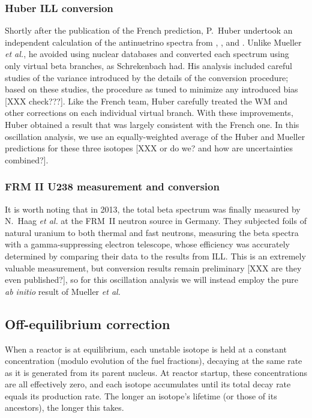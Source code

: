 \documentclass[../thesis.tex]{subfiles}
\begin{document}
\subsubsection{Huber ILL conversion}
\label{sec:huberconv}

Shortly after the publication of the French prediction, P.~Huber undertook an independent calculation of the antinuetrino spectra from \urfive, \punine, and \puone. Unlike Mueller \emph{et al.}, he avoided using nuclear databases and converted each spectrum using only virtual beta branches, as Schrekenbach had. His analysis included careful studies of the variance introduced by the details of the conversion procedure; based on these studies, the procedure as tuned to minimize any introduced bias [XXX check???]. Like the French team, Huber carefully treated the WM and other corrections on each individual virtual branch. With these improvements, Huber obtained a result that was largely consistent with the French one. In this oscillation analysis, we use an equally-weighted average of the Huber and Mueller predictions for these three isotopes [XXX or do we? and how are uncertainties combined?].

\subsubsection{FRM II U238 measurement and conversion}
\label{sec:u238conv}

It is worth noting that in 2013, the \ureight total beta spectrum was finally measured by N.~Haag \emph{et al.} at the FRM~II neutron source in Germany. They subjected foils of natural uranium to both thermal and fast neutrons, measuring the beta spectra with a gamma-suppressing electron telescope, whose efficiency was accurately determined by comparing their \urfive data to the results from ILL. This is an extremely valuable measurement, but conversion results remain preliminary [XXX are they even published?], so for this oscillation analysis we will instead employ the pure \emph{ab initio} result of Mueller \emph{et al.}

\subsection{Off-equilibrium correction}
\label{sec:offeqcorr}

When a reactor is at equilibrium, each unstable isotope is held at a constant concentration (modulo evolution of the fuel fractions), decaying at the same rate as it is generated from its parent nucleus. At reactor startup, these concentrations are all effectively zero, and each isotope accumulates until its total decay rate equals its production rate. The longer an isotope's lifetime (or those of its ancestors), the longer this takes.
\end{document}
